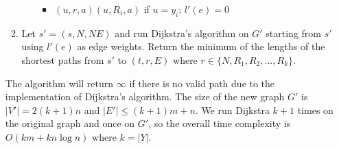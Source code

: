 \documentclass[11pt]{article}
\begin{document}
\begin{solution}
\begin{enumerate}[(a)]
\begin{enumerate}[(1)]
\begin{itemize}
\begin{itemize}
\item $(u, r, a)(u, R_i, a)$ if $u=y_i$; $l'(e)=0$
\end{itemize}
\end{itemize}
\item Let $s'=(s, N, NE)$ and run Dijkstra's algorithm on $G'$ starting from $s'$ using $l'(e)$ as edge weights. Return the minimum of the lengths of the shortest paths from $s'$ to $(t,r,E)$ where $r\in\{N, R_1, R_2, ..., R_k\}$.
\end{enumerate}
The algorithm will return $\infty$ if there is no valid path due to the implementation of Dijkstra's algorithm. The size of the new graph $G'$ is $|V'|=2(k+1)n$ and $|E'|\le (k+1)m + n$. We run Dijkstra $k+1$ times on the original graph and once on $G'$, so the overall time complexity is $O(km+kn\log{n})$ where $k=|Y|$.
\end{enumerate}
\end{solution}

\end{document}
